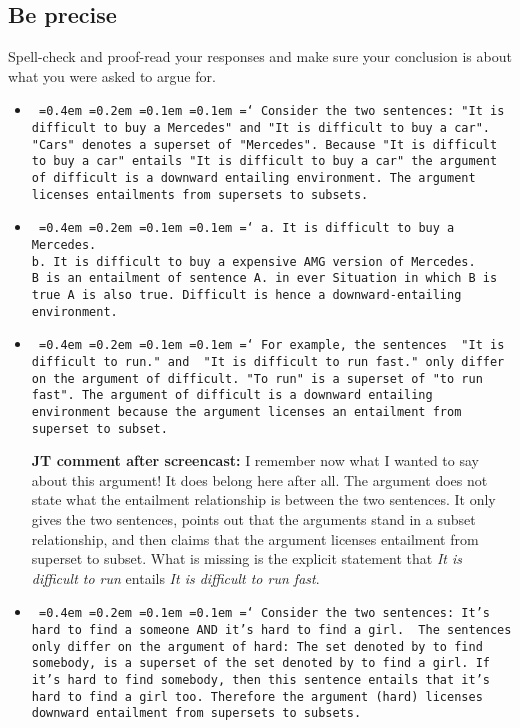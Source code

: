 \documentclass[a4,11pt]{article}
\newcommand*\justify{%
  \fontdimen2\font=0.4em%
  \fontdimen3\font=0.2em%
  \fontdimen4\font=0.1em%
  \fontdimen7\font=0.1em%
  \hyphenchar\font=`\-%
}
\begin{document}
\subsection*{Be precise}

Spell-check and proof-read your responses and make sure your conclusion is about what you were asked to argue for. 

\begin{itemize}[leftmargin = 12pt]

\item \texttt{\justify Consider the two sentences: "It is difficult to buy a Mercedes" and "It is difficult to buy a car". "Cars" denotes a superset of "Mercedes". Because "It is difficult to buy a car" entails "It is difficult to buy a car" the argument of difficult is a downward entailing environment. The argument licenses entailments from supersets to subsets.}

\item \texttt{\justify a. It is difficult to buy a Mercedes.  \\ b. It is difficult to buy a expensive AMG version of Mercedes.
\\ B is an entailment of sentence A. in ever Situation in which B is true A is also true. Difficult is hence a downward-entailing environment.}

\item \texttt{\justify For example, the sentences  "It is difficult to run." and  "It is difficult to run fast." only differ on the argument of difficult. "To run" is a superset of "to run fast". The argument of difficult is a downward entailing environment because the argument licenses an entailment from superset to subset.}

{\bf JT comment after screencast:} I remember now what I wanted to say about this argument! It does belong here after all. The argument does not state what the entailment relationship is between the two sentences. It only gives the two sentences, points out that the arguments stand in a subset relationship, and then claims that the argument licenses entailment from superset to subset. What is missing is the explicit statement that {\em It is difficult to run} entails {\em It is difficult to run fast}.

\item \texttt{\justify Consider the two sentences: It's hard to find a someone AND it's hard to find a girl. 
The sentences only differ on the argument of hard: The set denoted by to find somebody, is a superset of the set denoted by to find a girl.
If it's hard to find somebody, then this sentence entails that it's hard to find a girl too. Therefore the argument (hard) licenses downward entailment from supersets to subsets.}


\end{itemize}
\end{document}
